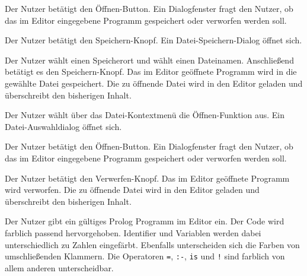 \documentclass[parskip=full,11pt,twoside]{scrartcl}
\begin{document}
{Der Nutzer betätigt den Öffnen-Button.}
{Ein Dialogfenster fragt den Nutzer, ob das im Editor eingegebene Programm gespeichert oder verworfen werden soll.}

{Der Nutzer betätigt den Speichern-Knopf.}
{Ein Datei-Speichern-Dialog öffnet sich.}

{Der Nutzer wählt einen Speicherort und wählt einen Dateinamen. Anschließend betätigt es den Speichern-Knopf.}
{Das im Editor geöffnete Programm wird in die gewählte Datei gespeichert. Die zu öffnende Datei wird in den Editor geladen und überschreibt den bisherigen Inhalt.}



{Der Nutzer wählt über das Datei-Kontextmenü die Öffnen-Funktion aus.}
{Ein Datei-Auswahldialog öffnet sich.}

{Der Nutzer betätigt den Öffnen-Button.}
{Ein Dialogfenster fragt den Nutzer, ob das im Editor eingegebene Programm gespeichert oder verworfen werden soll.}

{Der Nutzer betätigt den Verwerfen-Knopf.}
{Das im Editor geöffnete Programm wird verworfen. Die zu öffnende Datei wird in den Editor geladen und überschreibt den bisherigen Inhalt.}



{Der Nutzer gibt ein gültiges Prolog Programm im Editor ein.}
{Der Code wird farblich passend hervorgehoben. Identifier und Variablen werden dabei unterschiedlich zu Zahlen eingefärbt. Ebenfalls unterscheiden sich die Farben von umschließenden Klammern. Die Operatoren \texttt{=}, \texttt{:-}, \texttt{is} und \texttt{!} sind farblich von allem anderen unterscheidbar.}
\end{document}
